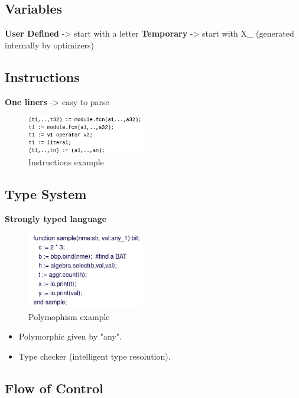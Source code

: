 \documentclass[11pt]{article}
\begin{document}
\subsection{Variables}
\label{sec:orgd55972e}

\textbf{User Defined} -> start with a letter
\textbf{Temporary}    -> start with X\_ (generated internally by optimizers)

\subsection{Instructions}
\label{sec:org984b27d}

\textbf{One liners}   -> easy to parse

\begin{figure}[htbp]
\centering
\includegraphics[width=2.0in]{./Pictures/instructions-ex.png}
\caption{\label{fig:org0b68f90}
Instructions example}
\end{figure}

\subsection{Type System}
\label{sec:org0657124}

\textbf{Strongly typed language}

\begin{figure}[htbp]
\centering
\includegraphics[width=2.0in]{./Pictures/poly-ex.png}
\caption{\label{fig:orgc37f81c}
Polymophism example}
\end{figure}

\begin{itemize}
\item Polymorphic given by "any".
\item Type checker (intelligent type resolution).
\end{itemize}

\subsection{Flow of Control}
\label{sec:orge1909ff}
\end{document}
